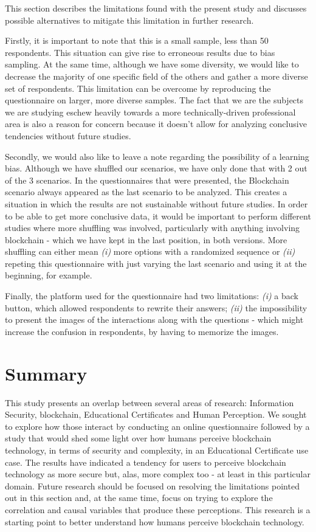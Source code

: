 This section describes the limitations found with the present study and discusses possible alternatives to mitigate this limitation in further research. 

Firstly, it is important to note that this is a small sample, less than 50 respondents. This situation can give rise to erroneous results due to bias sampling. At the same time, although we have some diversity, we would like to decrease the majority of one specific field of the others and gather a more diverse set of respondents. This limitation can be overcome by reproducing the questionnaire on larger, more diverse samples. The fact that we are the subjects we are studying eschew heavily towards a more technically-driven professional area is also a reason for concern because it doesn't allow for analyzing conclusive tendencies without future studies.

Secondly, we would also like to leave a note regarding the possibility of a learning bias. Although we have shuffled our scenarios, we have only done that with 2 out of the 3 scenarios. In the questionnaires that were presented, the Blockchain scenario always appeared as the last scenario to be analyzed. This creates a situation in which the results are not sustainable without future studies. In order to be able to get more conclusive data, it would be important to perform different studies where more shuffling was involved, particularly with anything involving blockchain - which we have kept in the last position, in both versions. More shuffling can either mean \textit{(i)} more options with a randomized sequence or \textit{(ii)} repeting this questionnaire with just varying the last scenario and using it at the beginning, for example.

Finally, the platform used for the questionnaire had two limitations: \textit{(i)} a back button, which allowed respondents to rewrite their answers; \textit{(ii)} the impossibility to present the images of the interactions along with the questions - which might increase the confusion in respondents, by having to memorize the images.

\section{Summary}

This study presents an overlap between several areas of research: Information Security, blockchain, Educational Certificates and Human Perception. We sought to explore how those interact by conducting an online questionnaire followed by a study that would shed some light over how humans perceive blockchain technology, in terms of security and complexity, in an Educational Certificate use case. The results have indicated a tendency for users to perceive blockchain technology as more secure but, alas, more complex too - at least in this particular domain. Future research should be focused on resolving the limitations pointed out in this section and, at the same time, focus on trying to explore the correlation and causal variables that produce these perceptions. This research is a starting point to better understand how humans perceive blockchain technology.